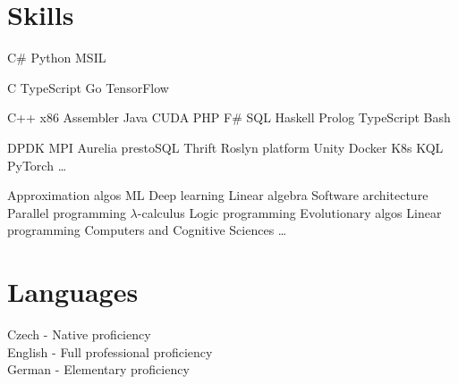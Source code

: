 \documentclass[a4paper]{deedy-resume} %
\begin{document}
\begin{minipage}[t]{0.33\textwidth}
\sectionspace %


\section{Skills}


C\# \textbullet{}  Python \textbullet{} MSIL \\ 
\halfsectionspace %

C \textbullet{} TypeScript \textbullet{} Go \textbullet{} TensorFlow \\
\halfsectionspace %

C++ \textbullet{} x86 Assembler \textbullet{} Java \textbullet{} CUDA \textbullet{} PHP \textbullet{} F\# \textbullet SQL \textbullet{} Haskell \textbullet{} Prolog \textbullet TypeScript \textbullet{} Bash \\

\sectionspace %

DPDK \textbullet{} MPI \textbullet{} Aurelia \textbullet{} prestoSQL \textbullet{} Thrift \textbullet{} Roslyn platform \textbullet{} Unity \textbullet{} Docker \textbullet{} K8s \textbullet{} KQL \textbullet{} PyTorch \textbullet{} \ldots \\

\sectionspace %


Approximation algos \textbullet{} ML \textbullet{} Deep learning \textbullet{} Linear algebra \textbullet{} Software architecture \textbullet{} Parallel programming \textbullet{} $\lambda$-calculus \textbullet{} Logic programming \textbullet{} Evolutionary algos \textbullet{} Linear programming \textbullet{} Computers and Cognitive Sciences \textbullet{} \ldots 

\sectionspace %

\section{Languages}

Czech - Native proficiency \\
English - Full professional proficiency \\
German - Elementary proficiency


\end{minipage}
\end{document}
